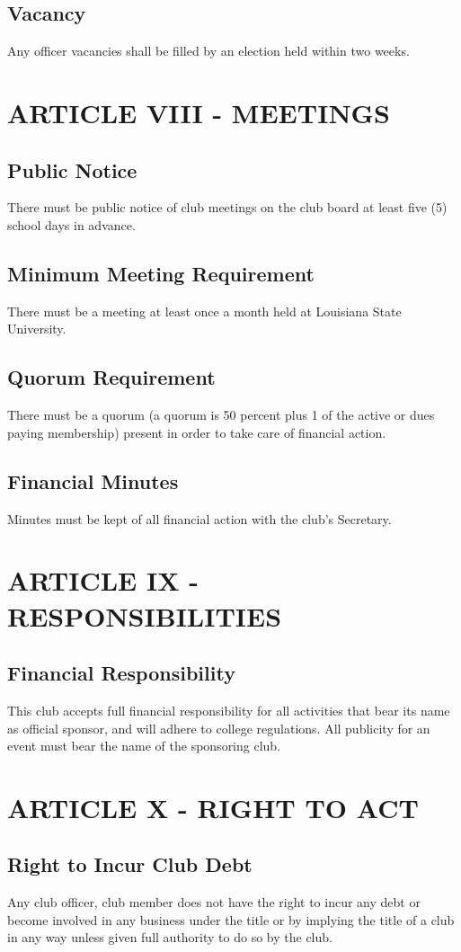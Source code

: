 \documentclass[11pt]{amsart}
\begin{document}
\subsection{Vacancy}
Any officer vacancies shall be filled by an election held within two weeks.


\section{ARTICLE VIII - MEETINGS}
\subsection{Public Notice}
There must be public notice of club meetings on the club board at least five (5) school days in advance.
\subsection{Minimum Meeting Requirement}
There must be a meeting at least once a month held at Louisiana State University.
\subsection{Quorum Requirement}
There must be a quorum (a quorum is 50 percent plus 1 of the active or dues paying membership) present in order to take care of financial action.
\subsection{Financial Minutes}
Minutes must be kept of all financial action with the club’s Secretary.

\section{ARTICLE IX - RESPONSIBILITIES}
\subsection{Financial Responsibility}
This club accepts full financial responsibility for all activities that bear its name as official sponsor, and will adhere to college regulations.  All publicity for an event must bear the name of the sponsoring club.

\section{ARTICLE X - RIGHT TO ACT}
\subsection{Right to Incur Club Debt}
Any club officer, club member does not have the right to incur any debt or become involved in any business under the title or by implying the title of a club in any way unless given full authority to do so by the club.
\end{document}
